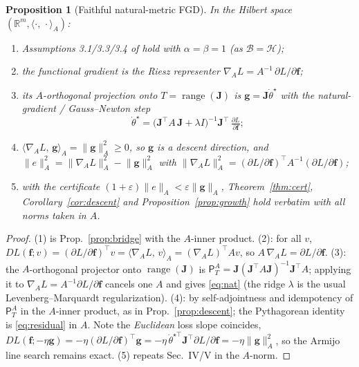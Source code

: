 \documentclass[conference]{IEEEtran}
\newtheorem{proposition}{Proposition}
\theoremstyle{remark}
\DeclareMathOperator{\range}{range}
\newcommand{\R}{\mathbb{R}}
\newcommand{\inner}[2]{\langle #1,\, #2\rangle}
\newcommand{\norm}[1]{\lVert #1\rVert}
\newcommand{\grad}{\nabla}
\newcommand{\eps}{\varepsilon}
\newcommand{\J}{\mathbf{J}}
\newcommand{\f}{\bm{f}}
\newcommand{\g}{\bm{g}}
\newcommand{\transpose}{^{\!\top}}
\begin{document}
\begin{proposition}[Faithful natural-metric FGD]\label{prop:natural}
In the Hilbert space $(\R^m,\inner\cdot\cdot_A)$:
\begin{enumerate}
\item Assumptions 3.1/3.3/3.4 of \cite{fgd} hold with $\alpha=\beta=1$ (as
$\mathcal B=\mathcal H$);
\item the functional gradient is the Riesz representer
$\grad_A L=A^{-1}\,\partial L/\partial\f$;
\item its $A$-orthogonal projection onto $T=\range(\J)$ is $\g=\J\dot\theta^\star$
with the \emph{natural-gradient / Gauss--Newton} step
\begin{equation}\label{eq:nat}
\dot\theta^\star=\big(\J\transpose A\,\J+\lambda I\big)^{-1}\J\transpose\,
\tfrac{\partial L}{\partial\f};
\end{equation}
\item $\inner{\grad_A L}{\g}_A=\norm{\g}_A^2\ge0$, so $\g$ is a descent direction,
and $\norm{e}_A^2=\norm{\grad_A L}_A^2-\norm{\g}_A^2$ with
$\norm{\grad_A L}_A^2=(\partial L/\partial\f)\transpose A^{-1}(\partial L/\partial\f)$;
\item with the certificate $(1+\eps)\norm{e}_A<\eps\norm{\g}_A$, Theorem~\ref{thm:cert},
Corollary~\ref{cor:descent} and Proposition~\ref{prop:growth} hold verbatim with
all norms taken in $A$.
\end{enumerate}
\end{proposition}
\begin{proof}
(1) is Prop.~\ref{prop:bridge} with the $A$-inner product. (2): for all $v$,
$DL(\f;v)=(\partial L/\partial\f)\transpose v=\inner{\grad_A L}{v}_A
=(\grad_A L)\transpose A v$, so $A\,\grad_A L=\partial L/\partial\f$. (3): the
$A$-orthogonal projector onto $\range(\J)$ is
$\mathsf P_T^A=\J(\J\transpose A\J)^{-1}\J\transpose A$; applying it to
$\grad_A L=A^{-1}\partial L/\partial\f$ cancels one $A$ and gives \eqref{eq:nat}
(the ridge $\lambda$ is the usual Levenberg--Marquardt regularization). (4): by
self-adjointness and idempotency of $\mathsf P_T^A$ in the $A$-inner product, as in
Prop.~\ref{prop:descent}; the Pythagorean identity is \eqref{eq:residual} in $A$.
Note the \emph{Euclidean} loss slope coincides,
$DL(\f;-\eta\g)=-\eta(\partial L/\partial\f)\transpose\g
=-\eta\,\dot\theta^{\star\top}\J\transpose\partial L/\partial\f=-\eta\norm{\g}_A^2$,
so the Armijo line search remains exact. (5) repeats Sec.~IV/V in the $A$-norm.
\end{proof}
\end{document}

